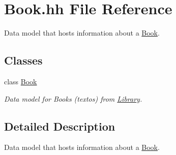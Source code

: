 \hypertarget{_book_8hh}{}\section{Book.\+hh File Reference}
\label{_book_8hh}


Data model that hosts information about a \hyperlink{class_book}{Book}.  


\subsection*{Classes}
\begin{DoxyCompactItemize}
\item 
class \hyperlink{class_book}{Book}
\begin{DoxyCompactList}\small\item\em Data model for Books (textos) from \hyperlink{class_library}{Library}. \end{DoxyCompactList}\end{DoxyCompactItemize}


\subsection{Detailed Description}
Data model that hosts information about a \hyperlink{class_book}{Book}. 

